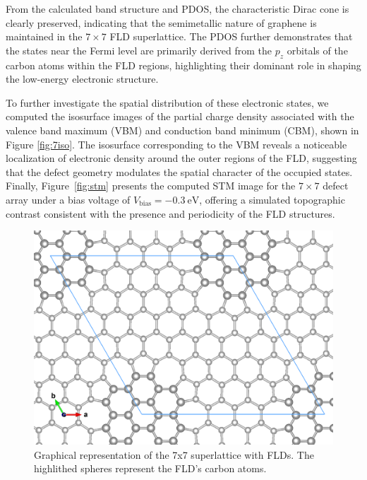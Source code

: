\documentclass{article}
\begin{document}
From the calculated band structure and PDOS, the characteristic Dirac cone is clearly preserved, indicating that the semimetallic nature of graphene is maintained in the $7 \times 7$ FLD superlattice. The PDOS further demonstrates that the states near the Fermi level are primarily derived from the $p_z$ orbitals of the carbon atoms within the FLD regions, highlighting their dominant role in shaping the low-energy electronic structure.

To further investigate the spatial distribution of these electronic states, we computed the isosurface images of the partial charge density associated with the valence band maximum (VBM) and conduction band minimum (CBM), shown in Figure \ref{fig:7iso}. The isosurface corresponding to the VBM reveals a noticeable localization of electronic density around the outer regions of the FLD, suggesting that the defect geometry modulates the spatial character of the occupied states. Finally, Figure~\ref{fig:stm} presents the computed STM image for the $7 \times 7$ defect array under a bias voltage of $V_{\text{bias}} = -0.3~\text{eV}$, offering a simulated topographic contrast consistent with the presence and periodicity of the FLD structures.

\begin{figure}[H]
  \centering
  \includegraphics[scale=0.2]{../figures/7x7_FLD.png}
  \caption{Graphical representation of the 7x7 superlattice with FLDs. The highlithed spheres represent the FLD's carbon atoms.}
  \label{fig:system}
\end{figure}
\end{document}
